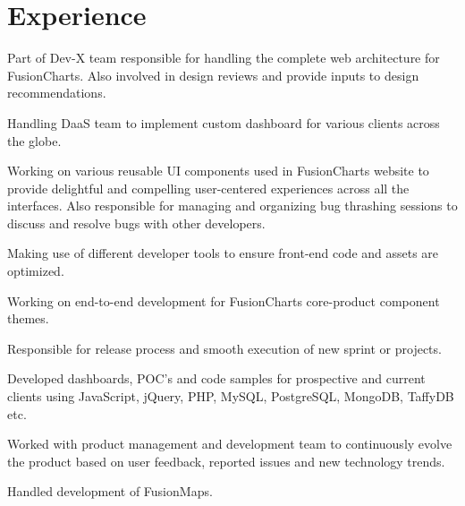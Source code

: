\documentclass[]{gagan-resume}
\begin{document}
\begin{minipage}[t]{0.65\textwidth}

\vspace{\topsep}
\section{Experience}

\vspace{\topsep}
\vspace{\topsep}
\begin{tightemize}
\item Part of Dev-X team responsible for handling the complete web architecture for FusionCharts. Also involved in design reviews and provide inputs to design recommendations.
\item Handling DaaS team to implement custom dashboard
for various clients across the globe.
\item Working on various reusable UI components used in FusionCharts website to provide delightful and compelling user-centered experiences across all the interfaces. Also responsible for managing and organizing bug thrashing sessions to discuss and resolve bugs with other developers.
\item Making use of different developer tools to ensure front-end code and assets are optimized. 
\item Working on end-to-end development for FusionCharts core-product component themes.
\item Responsible for release process and smooth execution of new sprint or projects.
\end{tightemize}
\sectionsep

\vspace{\topsep}
\begin{tightemize}
\item Developed dashboards, POC’s and code samples for prospective and current clients using JavaScript, jQuery, PHP, MySQL, PostgreSQL, MongoDB, TaffyDB etc.
\item Worked with product management and development team to continuously evolve the product based on user feedback, reported issues and new technology trends.
\item Handled development of FusionMaps.
\end{tightemize}
\sectionsep


\end{minipage}
\end{document}
